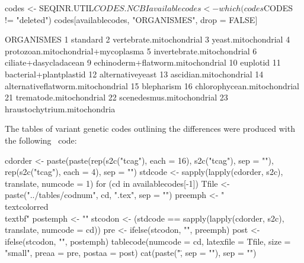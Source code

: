 \documentclass{article}
\begin{document}
\begin{Schunk}
\begin{Sinput}
 codes <- SEQINR.UTIL$CODES.NCBI
 availablecodes <- which(codes$CODES != "deleted")
 codes[availablecodes, "ORGANISMES", drop = FALSE]
\end{Sinput}
\begin{Soutput}
                           ORGANISMES
1                            standard
2            vertebrate.mitochondrial
3                 yeast.mitochondrial
4  protozoan.mitochondrial+mycoplasma
5          invertebrate.mitochondrial
6               ciliate+dasycladacean
9   echinoderm+flatworm.mitochondrial
10                           euplotid
11             bacterial+plantplastid
12                   alternativeyeast
13             ascidian.mitochondrial
14  alternativeflatworm.mitochondrial
15                         blepharism
16        chlorophycean.mitochondrial
21            trematode.mitochondrial
22          scenedesmus.mitochondrial
23       hraustochytrium.mitochondria
\end{Soutput}
\end{Schunk}

The tables of variant genetic codes outlining the differences were produced with the
following \Rlogo{}~code:

\begin{Schunk}
\begin{Sinput}
 cdorder <- paste(paste(rep(s2c("tcag"), each = 16), s2c("tcag"), 
     sep = ""), rep(s2c("tcag"), each = 4), sep = "")
 stdcode <- sapply(lapply(cdorder, s2c), translate, numcode = 1)
 for (cd in availablecodes[-1]) {
     Tfile <- paste("../tables/codnum", cd, ".tex", sep = "")
     preemph <- "\\textcolor{red}{\\textbf{"
     postemph <- "}}"
     stcodon <- (stdcode == sapply(lapply(cdorder, s2c), translate, 
         numcode = cd))
     pre <- ifelse(stcodon, "", preemph)
     post <- ifelse(stcodon, "", postemph)
     tablecode(numcode = cd, latexfile = Tfile, size = "small", 
         preaa = pre, postaa = post)
     cat(paste("\", sep = ""), sep = "\n")
 }
\end{Sinput}















\end{Schunk}
\end{document}
